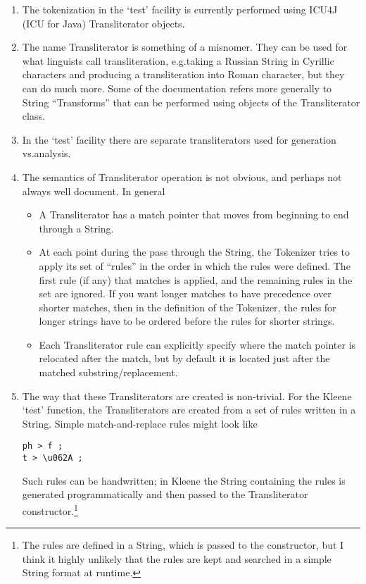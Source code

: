 \documentclass[letterpaper,12pt]{article}
\begin{document}
\begin{enumerate}
\item
The tokenization in the `test' facility is currently performed using ICU4J (ICU for
Java)
Transliterator objects.
\item
The name Transliterator is something of a misnomer.  They can be used for
what linguists call transliteration, e.g.\@ taking a Russian String in
Cyrillic characters and producing a transliteration into Roman character,
but they can do much more.  Some of the
documentation refers more generally to String ``Transforms'' that can be
performed using objects of the Transliterator class.
\item
In the `test' facility there are separate transliterators used for generation vs.\@ analysis.  
\item
The semantics of Transliterator operation is not obvious, and perhaps not
always well document.  In general
\begin{itemize}
\item
A Transliterator has a match pointer that moves from beginning to end
through a String.
\item
At each point during the pass through the String, the Tokenizer tries to
apply its set of ``rules'' in the order in which the rules were defined.
The first rule (if any) that matches is applied, and the remaining rules in the set
are ignored.  If you want longer matches to have precedence over shorter
matches, then in the definition of the Tokenizer, the rules for longer strings have to be ordered before the rules
for shorter strings.
\item
Each Transliterator rule can explicitly specify where the match pointer is relocated after the match, but
by default it is located just after the matched
substring/replacement.

\end{itemize}
\item
The way that these Transliterators are created is non-trivial. For the
Kleene `test' function, the Transliterators are created from a set of rules
written in a String.  Simple match-and-replace rules might look like

\begin{Verbatim}[fontsize=\small]
ph > f ;
t > \u062A ;
\end{Verbatim}

\noindent
Such rules can be handwritten; in Kleene the String containing the rules is generated
programmatically and then passed to the
Transliterator constructor.\footnote{The rules are defined in a String,
which is passed to the constructor, but I think it highly unlikely that the
rules are kept and searched in a simple String format at runtime.}

\end{enumerate}
\end{document}
